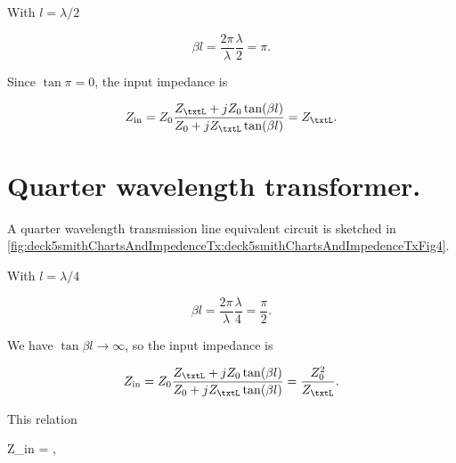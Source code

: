 
With \( l = \lambda/2 \)

\begin{dmath}\label{eqn:uwavesDeck5SmithChartCore:180}
\beta l
= \frac{2 \pi}{\lambda} \frac{\lambda}{2}
= \pi.
\end{dmath}

Since \( \tan \pi = 0 \), the input impedance is

\begin{dmath}\label{eqn:uwavesDeck5SmithChartCore:200}
Z_{\textrm{in}}
= Z_0 \frac{ Z_\txtL + j Z_0 \tan(\beta l) }{ Z_0 + j Z_\txtL \tan(\beta l)}
= Z_\txtL.
\end{dmath}

\section{Quarter wavelength transformer.}

A quarter wavelength transmission line equivalent circuit is sketched in \cref{fig:deck5smithChartsAndImpedenceTx:deck5smithChartsAndImpedenceTxFig4}.


With \( l = \lambda/4 \)

\begin{dmath}\label{eqn:uwavesDeck5SmithChartCore:220}
\beta l
= \frac{2 \pi}{\lambda} \frac{\lambda}{4}
= \frac{\pi}{2}.
\end{dmath}

We have \( \tan \beta l \rightarrow \infty \), so the input impedance is

\begin{dmath}\label{eqn:uwavesDeck5SmithChartCore:240}
Z_{\textrm{in}}
= Z_0 \frac{ Z_\txtL + j Z_0 \tan(\beta l) }{ Z_0 + j Z_\txtL \tan(\beta l)}
= \frac{Z_0^2}{Z_\txtL}.
\end{dmath}

This relation

{
Z_{\textrm{in}}
= ,
}


